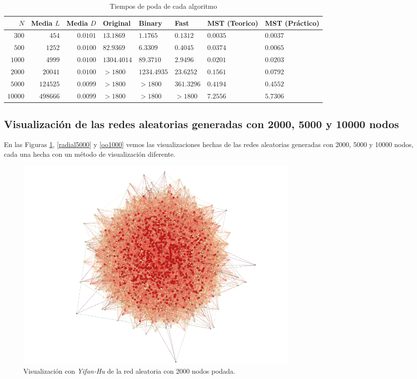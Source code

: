 \documentclass[10pt,a4paper,spanish]{article}
\numberwithin{equation}{section} %
\numberwithin{figure}{section} %
\numberwithin{table}{section} %
\begin{document}
\begin{table}[!h]
\begin{tabular}{rrrlllll}
\hline
    $N$ &    Media $L$ &   Media $D$ & Original             & Binary               & Fast                 & MST (Teorico)          & MST (Práctico)         \\
\hline
$300$ & $454$ & $0.0101$ & $13.1869$ & $1.1765$ & $0.1312$ & $0.0035$ & $0.0037$ \\
$500$ &   $1252$ & $0.0100$  & $82.9369$  & $6.3309$  & $0.4045$ & $0.0374$ & $0.0065$ \\
$1000$ & $4999$ & $0.0100$   &       $1304.4014$ & $89.3710$  & $2.9496$ & $0.0201$  & $0.0203$ \\
$2000$ &  $20041$ & $0.0100$  &       $> 1800$ & $1234.4935$ & $23.6252$ & $0.1561$  & $0.0792$  \\
$5000$ & $124525$ & $0.0099$ & $> 1800$ & $> 1800$ & $361.3296$   & $0.4194$   & $0.4552$   \\
$10000$ & $498666$ & $0.0099$ & $> 1800$ & $> 1800$ & $> 1800$ & $7.2556$   & $5.7306$    \\
\hline
\end{tabular}
\caption{Tiempos de poda de cada algoritmo}
\label{tiempopoda}
\end{table}

\subsection{Visualización de las redes aleatorias generadas con 2000, 5000 y 10000 nodos}

En las Figuras \hyperref[yh2000]{\ref*{yh2000}}, \hyperref[radial5000]{\ref*{radial5000}} y \hyperref[oo1000]{\ref*{oo1000}} vemos las visualizaciones hechas de las redes aleatorias generadas con 2000, 5000 y 10000 nodos, cada una hecha con un método de visualización diferente.

\begin{figure}[!h]
  \centering
  \includegraphics[width=0.7\textwidth]{../visualizacion/2000_yf}
  \caption{Visualización con \textit{Yifan-Hu} de la red aleatoria con 2000 nodos podada.}
  \label{yh2000}
\end{figure}
\end{document}
